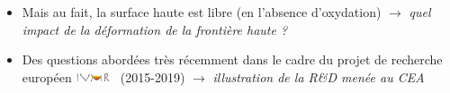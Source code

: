 \begin{frame}[fragile]
\begin{itemize}
\begin{columns}[T]
\begin{column}{0.75\textwidth}
\begin{itemize}
\item Hormis dans le cas singulier d'une condition adiabatique en surface haute, on s'attend à ce que $\phi^{met}_{lat}/\phi^{met}_{dwn} \rightarrow 0$ quand $H^{met} \rightarrow 0$
\item \emph{Validité de ces corrélations pour cette configuration ?}
\end{itemize}
    \end{column}
\end{columns}
\item Mais au fait, la surface haute est libre (en l'absence d'oxydation) $\rightarrow$ \emph{quel impact de la déformation de la frontière haute ?}
\item Des questions abordées très récemment dans le cadre du projet de recherche européen \includegraphics[width=1cm]{Figures/Logo_IVMR.pdf} ~(2015-2019) $\rightarrow$ \emph{illustration de la R\&D menée au CEA}
\end{itemize}
\end{frame}
